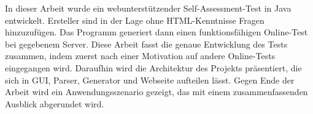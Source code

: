 \label{Abstract}
In dieser Arbeit wurde ein webunterstützender Self-Assessment-Test in Java entwickelt. Ersteller sind in der Lage ohne HTML-Kenntnisse Fragen hinzuzufügen. Das Programm generiert dann einen funktionsfähigen Online-Test bei gegebenem Server. Diese Arbeit fasst die genaue Entwicklung des Tests zusammen, indem zuerst nach einer Motivation auf andere Online-Tests eingegangen wird. Daraufhin wird die Architektur des Projekts präsentiert, die sich in GUI, Parser, Generator und Webseite aufteilen lässt. Gegen Ende der Arbeit wird ein Anwendungsszenario gezeigt, das mit einem zusammenfassenden Ausblick abgerundet wird.